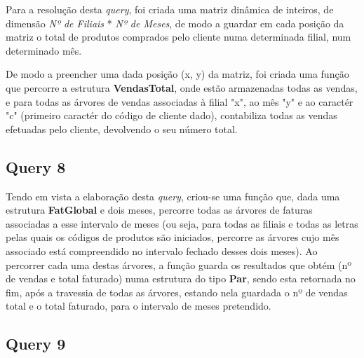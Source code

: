 \documentclass{article}
\begin{document}
\par\noindent\hspace{0.52cm}Para a resolução desta \textit{query}, foi criada uma matriz dinâmica de inteiros, de dimensão \textit{Nº de Filiais} * \textit{Nº de Meses}, de modo a guardar em cada posição da matriz o total de produtos comprados pelo cliente numa determinada filial, num determinado mês.
\par De modo a preencher uma dada posição (x, y) da matriz, foi criada uma função que percorre a estrutura \textbf{VendasTotal}, onde estão armazenadas todas as vendas, e para todas as árvores de vendas associadas à filial "x", ao mês "y" e ao caractér "c" (primeiro caractér do código de cliente dado), contabiliza todas as vendas efetuadas pelo cliente, devolvendo o seu número total.

\subsection{Query 8}


\vspace{1 cm}

\par\noindent\hspace{0.52cm}Tendo em vista a elaboração desta \textit{query}, criou-se uma função que, dada uma estrutura \textbf{FatGlobal} e dois meses, percorre todas as árvores de faturas associadas a esse intervalo de meses (ou seja, para todas as filiais e todas as letras pelas quais os códigos de produtos são iniciados, percorre as árvores cujo mês associado está compreendido no intervalo fechado desses dois meses). Ao percorrer cada uma destas árvores, a função guarda os resultados que obtém (nº de vendas e total faturado) numa estrutura do tipo \textbf{Par}, sendo esta retornada no fim, após a travessia de todas as árvores, estando nela guardada o nº de vendas total e o total faturado, para o intervalo de meses pretendido.

\subsection{Query 9}

\end{document}
